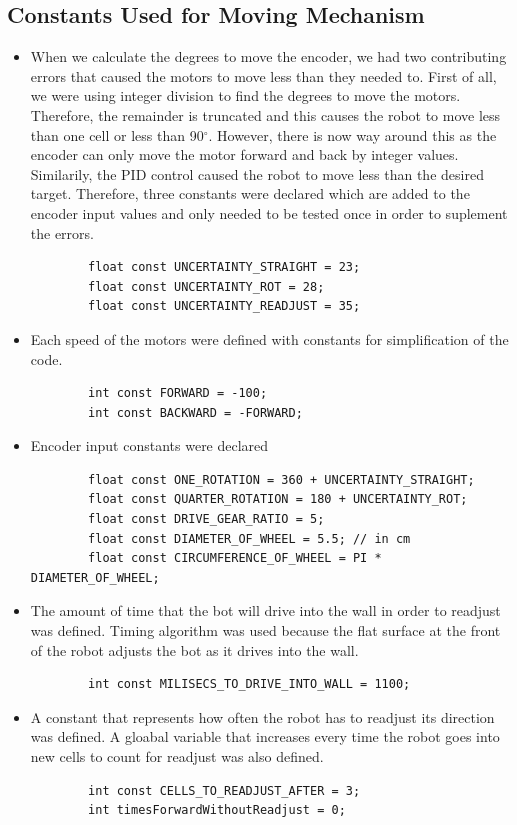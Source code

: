 \documentclass[11pt]{article}
\begin{document}

\subsection{Constants Used for Moving Mechanism}
\begin{itemize}
\item When we calculate the degrees to move the encoder, we had two contributing errors that caused the motors to move less than they needed to. First of all, we were using integer division to find the degrees to move the motors. Therefore, the remainder is truncated and this causes the robot to move less than one cell or less than 90$^{\circ}$. However, there is now way around this as the encoder can only move the motor forward and back by integer values. Similarily, the PID control caused the robot to move less than the desired target. Therefore, three constants were declared which are added to the encoder input values and only needed to be tested once in order to suplement the errors. 
	\begin{verbatim}
		float const UNCERTAINTY_STRAIGHT = 23;
		float const UNCERTAINTY_ROT = 28;
		float const UNCERTAINTY_READJUST = 35;
	\end{verbatim} 
\item Each speed of the motors were defined with constants for simplification of the code. 
	\begin{verbatim}
		int const FORWARD = -100;
		int const BACKWARD = -FORWARD;
	\end{verbatim} 
\item Encoder input constants were declared
	\begin{verbatim}
		float const ONE_ROTATION = 360 + UNCERTAINTY_STRAIGHT;
		float const QUARTER_ROTATION = 180 + UNCERTAINTY_ROT;
		float const DRIVE_GEAR_RATIO = 5;
		float const DIAMETER_OF_WHEEL = 5.5; // in cm
		float const CIRCUMFERENCE_OF_WHEEL = PI * DIAMETER_OF_WHEEL;
	\end{verbatim} 
\item The amount of time that the bot will drive into the wall in order to readjust was defined. Timing algorithm was used because the flat surface at the front of the robot adjusts the bot as it drives into the wall.
	\begin{verbatim}
		int const MILISECS_TO_DRIVE_INTO_WALL = 1100;
	\end{verbatim} 
\item A constant that represents how often the robot has to readjust its direction was defined. A gloabal variable that increases every time the robot goes into new cells to count for readjust was also defined.
	\begin{verbatim}
		int const CELLS_TO_READJUST_AFTER = 3;
		int timesForwardWithoutReadjust = 0;
	\end{verbatim}  
\end{itemize}
\end{document}
